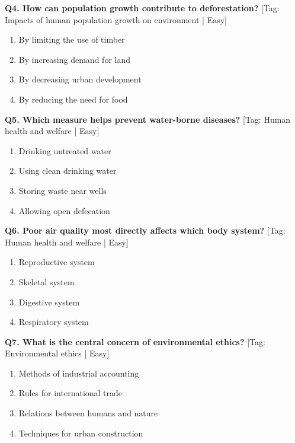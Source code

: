 \noindent\textbf{Q4. How can population growth contribute to deforestation?} \hfill [Tag: Impacts of human population growth on environment | Easy]
\begin{enumerate}[label=(\alph*),topsep=2pt,itemsep=1pt,partopsep=0pt,parsep=0pt]
    \item {By limiting the use of timber}
    \item {By increasing demand for land}
    \item {By decreasing urban development}
    \item {By reducing the need for food}
\end{enumerate}
\vspace{2mm}

\noindent\textbf{Q5. Which measure helps prevent water-borne diseases?} \hfill [Tag: Human health and welfare | Easy]
\begin{enumerate}[label=(\alph*),topsep=2pt,itemsep=1pt,partopsep=0pt,parsep=0pt]
    \item {Drinking untreated water}
    \item {Using clean drinking water}
    \item {Storing waste near wells}
    \item {Allowing open defecation}
\end{enumerate}
\vspace{2mm}

\noindent\textbf{Q6. Poor air quality most directly affects which body system?} \hfill [Tag: Human health and welfare | Easy]
\begin{enumerate}[label=(\alph*),topsep=2pt,itemsep=1pt,partopsep=0pt,parsep=0pt]
    \item {Reproductive system}
    \item {Skeletal system}
    \item {Digestive system}
    \item {Respiratory system}
\end{enumerate}
\vspace{2mm}

\noindent\textbf{Q7. What is the central concern of environmental ethics?} \hfill [Tag: Environmental ethics | Easy]
\begin{enumerate}[label=(\alph*),topsep=2pt,itemsep=1pt,partopsep=0pt,parsep=0pt]
    \item {Methods of industrial accounting}
    \item {Rules for international trade}
    \item {Relations between humans and nature}
    \item {Techniques for urban construction}
\end{enumerate}
\vspace{2mm}

